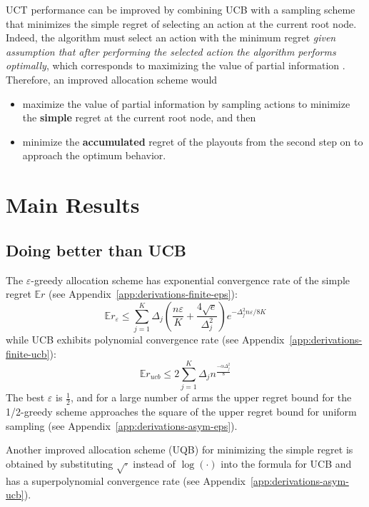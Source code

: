 \documentclass{article}
\newcommand {\IE} {\ensuremath {\mathbb{E}}}
\begin{document}
UCT performance can be improved by combining UCB with a sampling
scheme that minimizes the simple regret of selecting an action at the
current root node. Indeed, the algorithm must select an action with
the minimum regret \emph{given assumption that after performing the selected action
the algorithm performs optimally}, which corresponds to maximizing the
value of partial information \cite{Russell.aima}. Therefore, an
improved allocation scheme would
\begin{itemize}
\item maximize the value of partial
information by sampling actions to minimize the \textbf{simple} regret at the
current root node, and then 
\item minimize the \textbf{accumulated} regret of the playouts from the second
  step on to approach the optimum behavior. 
\end{itemize}


\section{Main Results}

\subsection{Doing better than UCB}

The $\varepsilon$-greedy allocation scheme has exponential convergence
rate of the simple regret $\IE r$ (see Appendix~\ref{app:derivations-finite-eps}):
\begin{equation}
  \IE r_\varepsilon\le\sum_{j=1}^K\Delta_j\left(\frac {n\varepsilon} K + \frac {4\sqrt e}
{\Delta_j^2}\right)e^{-\Delta_j^2n\varepsilon/8K}
\end{equation}
while UCB exhibits polynomial convergence
rate (see Appendix~\ref{app:derivations-finite-ucb}):
\begin{equation}
\IE r_{ucb} \le 2\sum_{j=1}^K \Delta_jn^{\frac {-\alpha \Delta_j^2} 8}
\end{equation}
The best $\varepsilon$ is $\frac 1 2$, and for a large number of arms
the upper regret bound for the 1/2-greedy scheme approaches the square of the
upper regret bound for uniform sampling (see
Appendix~\ref{app:derivations-asym-eps}).

Another improved allocation scheme (UQB) for minimizing the simple
regret is obtained by substituting $\sqrt{\cdot}$ instead of $\log(\cdot)$ into
the formula for UCB and has a superpolynomial convergence rate
(see Appendix~\ref{app:derivations-asym-ucb}).
\end{document}
